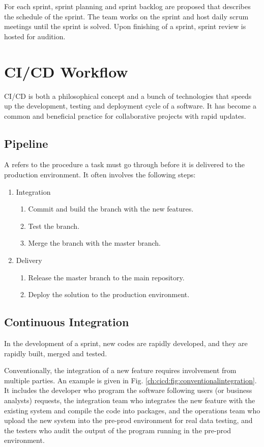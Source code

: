 For each sprint, sprint planning and sprint backlog are proposed that describes the schedule of the sprint. The team works on the sprint and host daily scrum meetings until the sprint is solved. Upon finishing of a sprint, sprint review is hosted for audition.

\section{CI/CD Workflow}

CI/CD is both a philosophical concept and a bunch of technologies that speeds up the development, testing and deployment cycle of a software. It has become a common and beneficial practice for collaborative projects with rapid updates.

\subsection{Pipeline}

A  refers to the procedure a task must go through before it is delivered to the production environment. It often involves the following steps:
\begin{enumerate}
  \item Integration
  \begin{enumerate}
    \item Commit and build the branch with the new features.
    \item Test the branch.
    \item Merge the branch with the master branch.
  \end{enumerate}
  \item Delivery
  \begin{enumerate}
    \item Release the master branch to the main repository.
    \item Deploy the solution to the production environment.
  \end{enumerate}
\end{enumerate}

\subsection{Continuous Integration}

In the development of a sprint, new codes are rapidly developed, and they are rapidly built, merged and tested.

Conventionally, the integration of a new feature requires involvement from multiple parties. An example is given in Fig. \ref{ch:cicd:fig:conventionalintegration}. It includes the developer who program the software following users (or business analysts) requests, the integration team who integrates the new feature with the existing system and compile the code into packages, and the operations team who upload the new system into the pre-prod environment for real data testing, and the testers who audit the output of the program running in the pre-prod environment.

